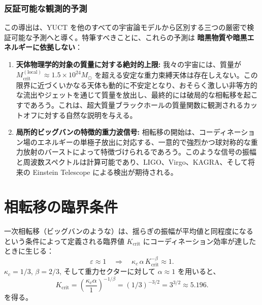 \documentclass[11pt,a4paper]{article}
\newcommand{\kappac}{\kappa_c}
\newcommand{\betaf}{\beta}
\begin{document}
	\subsubsection{反証可能な観測的予測}
	
	この導出は、YUCT を他のすべての宇宙論モデルから区別する三つの厳密で検証可能な予測へと導く。特筆すべきことに、これらの予測は \textbf{暗黒物質や暗黒エネルギーに依拠しない}：
	
	\begin{enumerate}
		\item \textbf{天体物理学的対象の質量に対する絶対的上限:} 我々の宇宙には、質量が \(M_{\mathrm{crit}}^{\mathrm{(local)}} \approx 1.5 \times 10^{24} M_{\odot}\) を超える安定な重力束縛天体は存在しえない。この限界に近づくいかなる天体も動的に不安定となり、おそらく激しい非等方的な流出やジェットを通じて質量を放出し、最終的には破局的な相転移を起こすであろう。これは、超大質量ブラックホールの質量関数に観測されるカットオフに対する自然な説明を与える。
		
		\item \textbf{局所的ビッグバンの特徴的重力波信号:} 相転移の開始は、コーディネーション場のエネルギーの単極子放出に対応する、一意的で強烈かつ球対称的な重力放射のバーストによって特徴づけられるであろう。このような信号の振幅と周波数スペクトルは計算可能であり、LIGO、Virgo、KAGRA、そして将来の Einstein Telescope による検出が期待される。
	\end{enumerate}
	
	\section{相転移の臨界条件}
	\label{sec:critical-condition}
	
	一次相転移（ビッグバンのような）は、揺らぎの振幅が平均値と同程度になるという条件によって定義される臨界値 \(K_{\mathrm{crit}}\) にコーディネーション効率が達したときに生じる：
	\begin{equation}
		\varepsilon \approx 1 \quad \Longrightarrow \quad \kappac \, \alpha \, K_{\mathrm{crit}}^{-\betaf} \approx 1.
		\label{eq:critical-condition}
	\end{equation}
	\(\kappac = 1/3\), \(\betaf = 2/3\), そして重力セクターに対して \(\alpha \approx 1\) を用いると、
	\begin{equation}
		K_{\mathrm{crit}} = \left( \frac{\kappac \alpha}{1} \right)^{-1/\betaf} = (1/3)^{-3/2} = 3^{3/2} \approx 5.196.
		\label{eq:Kcrit}
	\end{equation}
	を得る。
	
\end{document}
